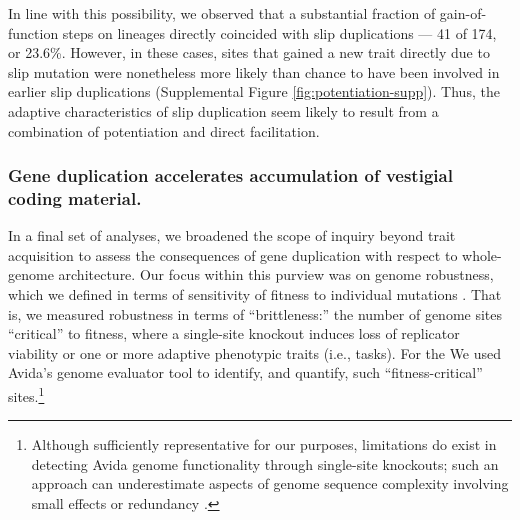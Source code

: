 In line with this possibility, we observed that a substantial fraction of gain-of-function steps on lineages directly coincided with slip duplications --- 41 of 174, or 23.6\%.
However, in these cases, sites that gained a new trait directly due to slip mutation were nonetheless more likely than chance to have been involved in earlier slip duplications (Supplemental Figure \ref{fig:potentiation-supp}).
Thus, the adaptive characteristics of slip duplication seem likely to result from a combination of potentiation and direct facilitation.

\subsubsection{Gene duplication accelerates accumulation of vestigial coding material.}



In a final set of analyses, we broadened the scope of inquiry beyond trait acquisition to assess the consequences of gene duplication with respect to whole-genome architecture.
Our focus within this purview was on genome robustness, which we defined in terms of sensitivity of fitness to individual mutations \citep{lenski1999genome}.
That is, we measured robustness in terms of ``brittleness:'' the number of genome sites ``critical'' to fitness, where a single-site knockout induces loss of replicator viability or one or more adaptive phenotypic traits (i.e., tasks).
For the We used Avida's genome evaluator tool to identify, and quantify, such ``fitness-critical'' sites.\footnote{%
Although sufficiently representative for our purposes, limitations do exist in detecting Avida genome functionality through single-site knockouts; such an approach can underestimate aspects of genome sequence complexity involving small effects or redundancy \citep{lenski1999genome,moreno2024cryptic}.
}

